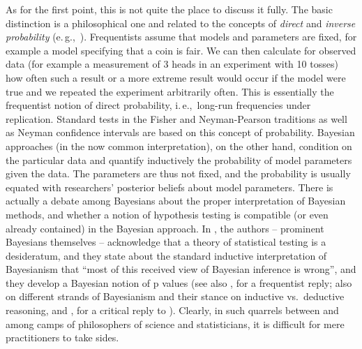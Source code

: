 \documentclass[USenglish]{article}
\newcommand{\eg}{e.\,g.,}
\newcommand{\ie}{i.\,e.,}
\begin{document}
As for the first point, this is not quite the place to discuss it fully.
The basic distinction is a philosophical one and related to the concepts of \textit{direct} and \textit{inverse probability} (\eg\ \citealp{Senn2011}).
Frequentists assume that models and parameters are fixed, for example a model specifying that a coin is fair.
We can then calculate for observed data (for example a measurement of 3 heads in an experiment with 10 tosses) how often such a result or a more extreme result would occur if the model were true and we repeated the experiment arbitrarily often.
This is essentially the frequentist notion of direct probability, \ie\ long-run frequencies under replication.
Standard tests in the Fisher and Neyman-Pearson traditions as well as Neyman confidence intervals are based on this concept of probability.
Bayesian approaches (in the now common interpretation), on the other hand, condition on the particular data and quantify inductively the probability of model parameters given the data.
The parameters are thus not fixed, and the probability is usually equated with researchers' posterior beliefs about model parameters.
There is actually a debate among Bayesians about the proper interpretation of Bayesian methods, and whether a notion of hypothesis testing is compatible (or even already contained) in the Bayesian approach.
In \citet[10]{GelmanShalizi2013}, the authors -- prominent Bayesians themselves -- acknowledge that a theory of statistical testing is a desideratum, and they state about the standard inductive interpretation of Bayesianism that ``most of this received view of Bayesian inference is wrong'', and they develop a Bayesian notion of p values (see also \citealp{Mayo2013}, for a frequentist reply; also \citealp{Senn2011} on different strands of Bayesianism and their stance on inductive vs.\ deductive reasoning, and \citealp{Mayo2011}, for a critical reply to \citealp{Senn2011}).
Clearly, in such quarrels between and among camps of philosophers of science and statisticians, it is difficult for mere practitioners to take sides.
\end{document}
